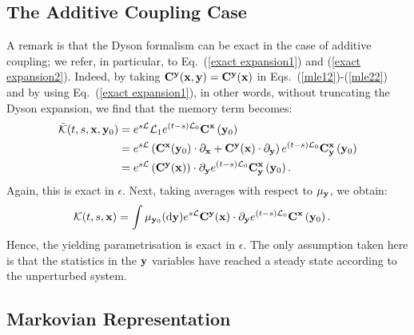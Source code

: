 \documentclass[12pt]{article}
\begin{document}
\subsection{The Additive Coupling Case}

A remark is that the Dyson formalism can be exact in the case of additive coupling; we refer, in particular, to Eq.~(\ref{exact expansion1}) and (\ref{exact expansion2}). Indeed, by taking $\mathbf{C} ^{\mathbf{y}}(\mathbf{x},\mathbf{y})=\mathbf{C} ^{\mathbf{y}}(\mathbf{x})$ in Eqs.~(\ref{mle12})-(\ref{mle22}) and by using Eq.~(\ref{exact expansion1}), in other words, without truncating the Dyson expansion, we find that the memory term becomes:
\begin{align}
	\tilde{\mathcal{K}}(t,s,\mathbf{x},\mathbf{y}_0)&=e^{s\mathcal{L}}\mathcal{L}_1e^{(t-s)\mathcal{L}_0}\mathbf{C}^{\mathbf{x}}\left(\mathbf{y}_0 \right) \\ &= e^{s\mathcal{L}}\left(\mathbf{C}^{\mathbf{x}}(\mathbf{y}_0) \cdot \partial _{\mathbf{x}} + \mathbf{C}^{\mathbf{y}}(\mathbf{x}) \cdot \partial _{\mathbf{y}}\right)e^{(t-s)\mathcal{L}_0}\mathbf{C}_{\mathbf{y}}^{\mathbf{x}}\left(\mathbf{y}_0 \right)\\ &= e^{s\mathcal{L}} \left(\mathbf{C}^{\mathbf{y}}(\mathbf{x}) \right)\cdot \partial _{\mathbf{y}}e^{(t-s)\mathcal{L}_0}\mathbf{C}_{\mathbf{y}}^{\mathbf{x}}\left(\mathbf{y}_0 \right).
\end{align}
Again, this is exact in $\epsilon$. Next, taking averages with respect to $\mu_{\mathbf{y}}$, we obtain:
\begin{align}
\mathcal{K}(t,s,\mathbf{x})&=  \int \mu _{\mathbf{y}_0}(\mathrm{d} \mathbf{y})e^{s\mathcal{L}} \mathbf{C}^{\mathbf{y}}(\mathbf{x}) \cdot \partial _{\mathbf{y}}e^{(t-s)\mathcal{L}_0}\mathbf{C}^{\mathbf{x}}\left(\mathbf{y}_0 \right).
\end{align}
Hence, the yielding parametrisation is exact in $\epsilon$. The only assumption taken here is that the statistics in the $\mathbf{y}$ variables have reached a steady state according to the unperturbed system. 

\subsection{Markovian Representation}
\end{document}
